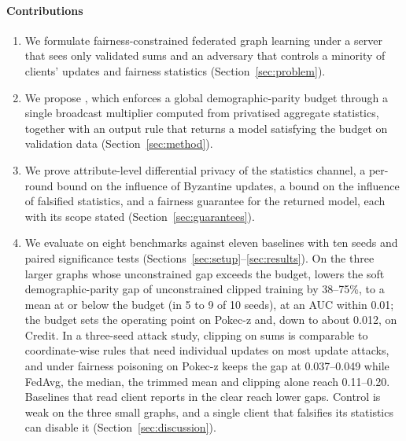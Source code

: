 \paragraph{Contributions}
\begin{enumerate}
\item We formulate fairness-constrained federated graph learning under a server that sees only validated sums and an adversary that controls a minority of clients' updates and fairness statistics (Section~\ref{sec:problem}).
\item We propose \clamp{}, which enforces a global demographic-parity budget through a single broadcast multiplier computed from privatised aggregate statistics, together with an output rule that returns a model satisfying the budget on validation data (Section~\ref{sec:method}).
\item We prove attribute-level differential privacy of the statistics channel, a per-round bound on the influence of Byzantine updates, a bound on the influence of falsified statistics, and a fairness guarantee for the returned model, each with its scope stated (Section~\ref{sec:guarantees}).
\item We evaluate \clamp{} on eight benchmarks against eleven baselines with ten seeds and paired significance tests (Sections~\ref{sec:setup}--\ref{sec:results}). On the three larger graphs whose unconstrained gap exceeds the budget, \clamp{} lowers the soft demographic-parity gap of unconstrained clipped training by 38--75\%, to a mean at or below the budget (in 5 to 9 of 10 seeds), at an AUC within 0.01; the budget sets the operating point on Pokec-z and, down to about 0.012, on Credit. In a three-seed attack study, clipping on sums is comparable to coordinate-wise rules that need individual updates on most update attacks, and under fairness poisoning on Pokec-z \clamp{} keeps the gap at 0.037--0.049 while FedAvg, the median, the trimmed mean and clipping alone reach 0.11--0.20. Baselines that read client reports in the clear reach lower gaps. Control is weak on the three small graphs, and a single client that falsifies its statistics can disable it (Section~\ref{sec:discussion}).
\end{enumerate}
